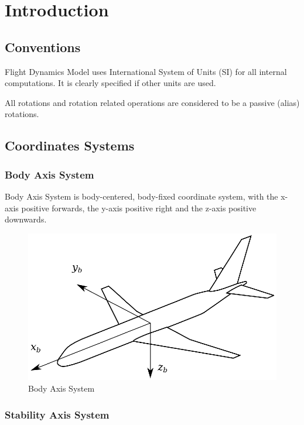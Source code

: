 \chapter{Introduction}


\section{Conventions}

Flight Dynamics Model uses International System of Units (SI) for all internal computations. It is clearly specified if other units are used.

All rotations and rotation related operations are considered to be a passive (alias) rotations.

\section{Coordinates Systems}

\subsection{Body Axis System}

Body Axis System is body-centered, body-fixed coordinate system, with the x-axis positive forwards, the y-axis positive right and the z-axis positive downwards.

\begin{figure}
  \centering
  \includegraphics[width=340pt]{images/coordinate_system_BAS.eps}
  \caption{Body Axis System}
\end{figure}

\subsection{Stability Axis System}

